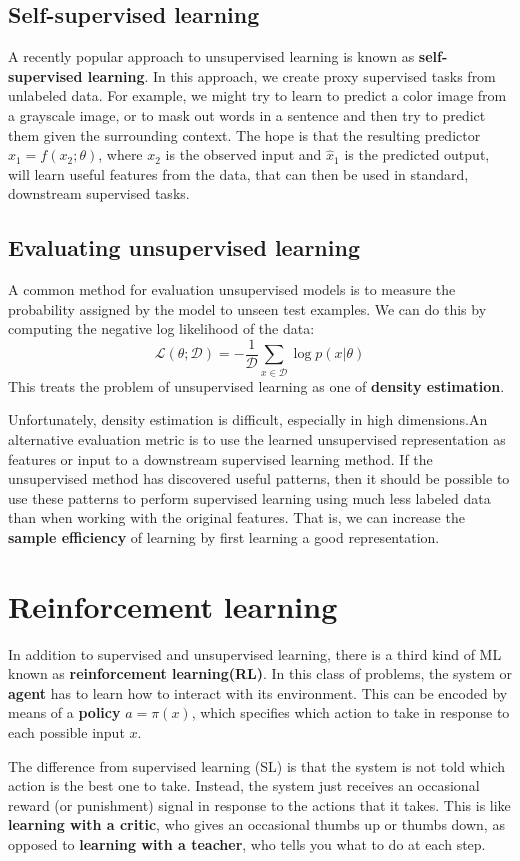 \subsection{Self-supervised learning}
A recently popular approach to unsupervised learning is known as \textbf{self-supervised learning}. In this approach, we create proxy supervised tasks from unlabeled data. For example, we might try to learn to predict a color image from a grayscale image, or to mask out words in a sentence and then try to predict them given the surrounding context. The hope is that the resulting predictor $\hat{x}_1 = f(x_2;\theta)$, where $x_2$ is the observed input and $\hat{x}_1$ is the predicted output, will learn useful features from the data, that can then be used in standard, downstream supervised tasks.
\subsection{Evaluating unsupervised learning}
A common method for evaluation unsupervised models is to measure the probability assigned by the model to unseen test examples. We can do this by computing the negative log likelihood of the data:
\begin{equation}
\mathcal{L}(\theta;\mathcal{D}) = -\frac{1}{\mathcal{D}}\sum_{x\in \mathcal{D}}\log{p(x|\theta)}
\end{equation}
This treats the problem of unsupervised learning as one of \textbf{density estimation}. 
\par
Unfortunately, density estimation is difficult, especially in high dimensions.An alternative evaluation metric is to use the learned unsupervised representation as features or input to a downstream supervised learning method. If the unsupervised method has discovered useful patterns, then it should be possible to use these patterns to perform supervised learning using much less labeled data than when working with the original features. That is, we can increase the \textbf{sample efficiency} of learning by first learning a good representation.
\section{Reinforcement learning}
In addition to supervised and unsupervised learning, there is a third kind of ML known as \textbf{reinforcement learning(RL)}. In this class of problems, the system or \textbf{agent} has to learn how to interact with its environment. This can be encoded by means of a \textbf{policy} $a = \pi(x)$, which specifies which action to take in response to each possible input $x$.
\par
The difference from supervised learning (SL) is that the system is not told which action is the best one to take. Instead, the system just receives an occasional reward (or punishment) signal in response to the actions that it takes. This is like \textbf{learning with a critic}, who gives an occasional thumbs up or thumbs down, as opposed to \textbf{learning with a teacher}, who tells you what to do at each step.
